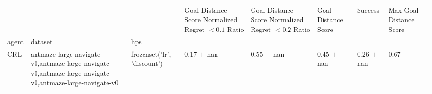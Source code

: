 \begin{tabular}{llllllll}
\toprule
 &  &  & Goal Distance Score Normalized Regret $< 0.1$ Ratio & Goal Distance Score Normalized Regret $< 0.2$ Ratio & Goal Distance Score & Success & Max Goal Distance Score \\
agent & dataset & hps &  &  &  &  &  \\
\midrule
CRL & antmaze-large-navigate-v0,antmaze-large-navigate-v0,antmaze-large-navigate-v0,antmaze-large-navigate-v0 & frozenset({'lr', 'discount'}) & 0.17 $\pm$ nan & 0.55 $\pm$ nan & 0.45 $\pm$ nan & 0.26 $\pm$ nan & 0.67 \\
\cline{1-8} \cline{2-8}
\bottomrule
\end{tabular}
